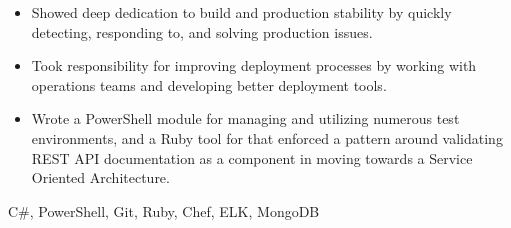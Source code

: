 \begin{experiences}
{\begin{itemize}
                        \item Showed deep dedication to build and production stability by quickly detecting, responding to, and solving production issues.
                        \item Took responsibility for improving deployment processes by working with operations teams and developing better deployment tools.
                        \item Wrote a PowerShell module for managing and utilizing numerous test environments, and a Ruby tool for that enforced a pattern around validating REST API documentation as a component in moving towards a Service Oriented Architecture.
                      \end{itemize}
                    }
                    {C\#, PowerShell, Git, Ruby, Chef, ELK, MongoDB}
\end{experiences}
